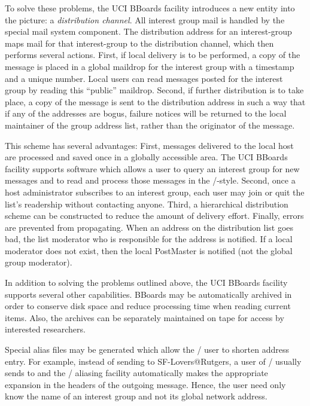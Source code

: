 To solve these problems,
the UCI BBoards facility introduces a new entity into the picture:
a {\it distribution channel}.
All interest group mail is handled by 
the special mail system component.
The distribution address for an interest-group
maps mail for that interest-group to the distribution channel,
which then performs
several actions.
First, if local delivery is to be performed,
a copy of the message is placed in a global maildrop for the interest
group with a timestamp and a unique number.
Local users can read messages posted for the interest group by reading this
``public'' maildrop.
Second, if further distribution is to take place,
a copy of the message is sent to the distribution address in such a way that
if any of the addresses are bogus,
failure notices will be returned to the local maintainer of the group
address list, rather than the originator of the message.

This scheme has several advantages:
First, messages delivered to the local host are processed and saved once
in a globally accessible area.
The UCI BBoards facility supports software which allows a user to query an
interest group for new messages and to read and process
those messages in the \MH/-style.
Second, once a host administrator subscribes to an interest group,
each user may join or quit the list's readership without
contacting anyone.
Third, a hierarchical distribution scheme can be constructed to
reduce the amount of delivery effort.
Finally, errors are prevented from propagating.
When an address on the distribution list goes bad,
the list moderator who is responsible for the address is notified.
If a local moderator does not exist,
then the local PostMaster is notified (not the global group moderator).

In addition to solving the problems outlined above,
the UCI BBoards facility supports several other capabilities.
BBoards may be automatically archived in order to conserve disk space and
reduce processing time when reading current items.
Also,
the archives can be separately maintained on tape for access by interested
researchers.

Special alias files may be generated which allow the \MH/ user to shorten
address entry.
For example, instead of sending to {\tx SF-Lovers@Rutgers},
a user of \MH/ usually sends to  and the \MH/ aliasing
facility automatically makes the appropriate expansion in the headers of the
outgoing message.
Hence,
the user need only know the name of an interest group and not its global
network address.

